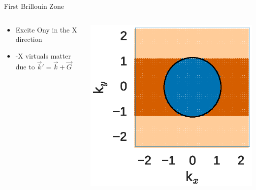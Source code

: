 \documentclass[10pt]{beamer}
\begin{document}
{{{{{{{{{{{{{{\begin{frame}{First Brillouin Zone}
	\begin{columns}[c] %
		\begin{column}{.4\textwidth}
			\begin{itemize}
				\item {Excite Ony in the X direction}
				\item {-X virtuals matter due to $\vec{k}' = \vec{k} + \vec{G}$}
			\end{itemize}				
		\end{column}
		\hfill
		\begin{column}{0.6\textwidth}
		    \begin{overprint}
			    \includegraphics[width=\linewidth]{../images/1stBZ.eps}

			\end{overprint}
		\end{column}	
	\end{columns}
\end{frame}

{%

}}}}}}}}}}}}}}}
\end{document}
